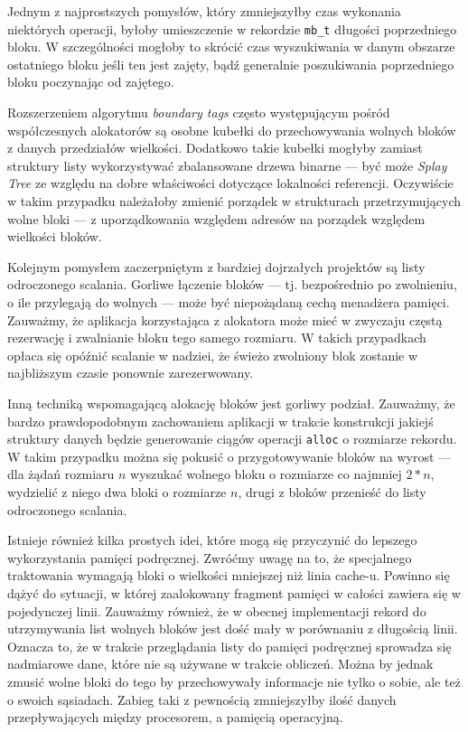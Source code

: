 \documentclass[12pt,a4paper,titlepage,twoside]{mwart}
\begin{document}
Jednym z najprostszych pomysłów, który zmniejszyłby czas wykonania niektórych
operacji, byłoby umieszczenie w rekordzie \verb+mb_t+ długości poprzedniego
bloku. W szczególności mogłoby to skrócić czas wyszukiwania w danym obszarze
ostatniego bloku jeśli ten jest zajęty, bądź generalnie poszukiwania
poprzedniego bloku poczynając od zajętego.

Rozszerzeniem algorytmu \textit{boundary tags} często występującym pośród
współczesnych alokatorów są osobne kubełki do przechowywania wolnych bloków z
danych przedziałów wielkości. Dodatkowo takie kubełki mogłyby zamiast struktury
listy wykorzystywać zbalansowane drzewa binarne --- być może \textit{Splay
Tree} ze względu na dobre właściwości dotyczące lokalności referencji.
Oczywiście w takim przypadku należałoby zmienić porządek w strukturach
przetrzymujących wolne bloki --- z uporządkowania względem adresów na
porządek względem wielkości bloków.

Kolejnym pomysłem zaczerpniętym z bardziej dojrzałych projektów są listy
odroczonego scalania. Gorliwe łączenie bloków --- tj. bezpośrednio po
zwolnieniu, o ile przylegają do wolnych --- może być niepożądaną cechą
menadżera pamięci. Zauważmy, że aplikacja korzystająca z alokatora może mieć w
zwyczaju częstą rezerwację i zwalnianie bloku tego samego rozmiaru. W takich
przypadkach opłaca się opóźnić scalanie w nadziei, że świeżo zwolniony blok
zostanie w najbliższym czasie ponownie zarezerwowany.

Inną techniką wspomagającą alokację bloków jest gorliwy podział. Zauważmy, że
bardzo prawdopodobnym zachowaniem aplikacji w trakcie konstrukcji jakiejś
struktury danych będzie generowanie ciągów operacji \verb+alloc+ o rozmiarze
rekordu. W takim przypadku można się pokusić o przygotowywanie bloków na wyrost
--- dla żądań rozmiaru $n$ wyszukać wolnego bloku o rozmiarze co najmniej
$2*n$, wydzielić z niego dwa bloki o rozmiarze $n$, drugi z bloków przenieść do
listy odroczonego scalania.

Istnieje również kilka prostych idei, które mogą się przyczynić do lepszego
wykorzystania pamięci podręcznej. Zwróćmy uwagę na to, że specjalnego
traktowania wymagają bloki o wielkości mniejszej niż linia cache-u. Powinno się
dążyć do sytuacji, w której zaalokowany fragment pamięci w całości zawiera się
w pojedynczej linii.  Zauważmy również, że w obecnej implementacji rekord do
utrzymywania list wolnych bloków jest dość mały w porównaniu z długością linii.
Oznacza to, że w trakcie przeglądania listy do pamięci podręcznej sprowadza się
nadmiarowe dane, które nie są używane w trakcie obliczeń. Można by jednak zmusić
wolne bloki do tego by przechowywały informacje nie tylko o sobie, ale też o
swoich sąsiadach. Zabieg taki z pewnością zmniejszyłby ilość danych
przepływających między procesorem, a pamięcią operacyjną.
\end{document}
